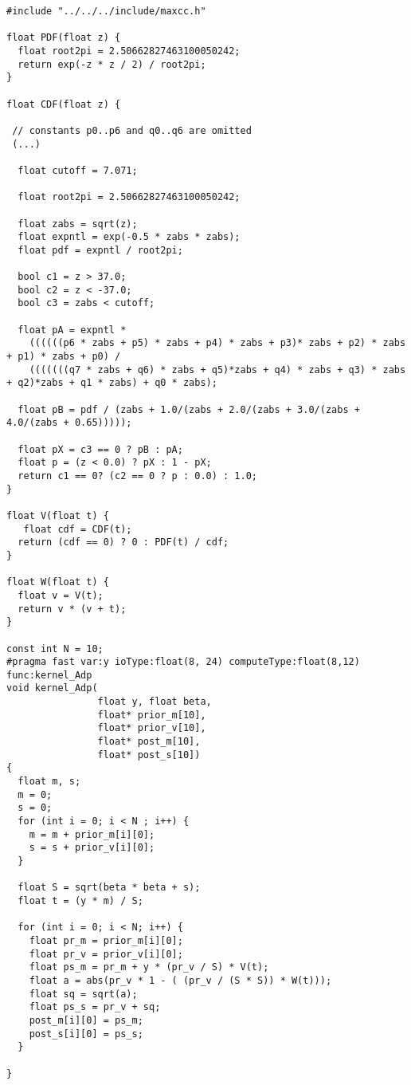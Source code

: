 \label{app:add-prediction}
\begin{lstlisting}
#include "../../../include/maxcc.h"

float PDF(float z) {
  float root2pi = 2.50662827463100050242;
  return exp(-z * z / 2) / root2pi;
}

float CDF(float z) {

 // constants p0..p6 and q0..q6 are omitted
 (...)

  float cutoff = 7.071;

  float root2pi = 2.50662827463100050242;

  float zabs = sqrt(z);
  float expntl = exp(-0.5 * zabs * zabs);
  float pdf = expntl / root2pi;

  bool c1 = z > 37.0;
  bool c2 = z < -37.0;
  bool c3 = zabs < cutoff;

  float pA = expntl *
    ((((((p6 * zabs + p5) * zabs + p4) * zabs + p3)* zabs + p2) * zabs + p1) * zabs + p0) /
    (((((((q7 * zabs + q6) * zabs + q5)*zabs + q4) * zabs + q3) * zabs + q2)*zabs + q1 * zabs) + q0 * zabs);

  float pB = pdf / (zabs + 1.0/(zabs + 2.0/(zabs + 3.0/(zabs + 4.0/(zabs + 0.65)))));

  float pX = c3 == 0 ? pB : pA;
  float p = (z < 0.0) ? pX : 1 - pX;
  return c1 == 0? (c2 == 0 ? p : 0.0) : 1.0;
}

float V(float t) {
   float cdf = CDF(t);
  return (cdf == 0) ? 0 : PDF(t) / cdf;
}

float W(float t) {
  float v = V(t);
  return v * (v + t);
}

const int N = 10;
#pragma fast var:y ioType:float(8, 24) computeType:float(8,12) func:kernel_Adp
void kernel_Adp(
                float y, float beta,
                float* prior_m[10],
                float* prior_v[10],
                float* post_m[10],
                float* post_s[10])
{
  float m, s;
  m = 0;
  s = 0;
  for (int i = 0; i < N ; i++) {
    m = m + prior_m[i][0];
    s = s + prior_v[i][0];
  }

  float S = sqrt(beta * beta + s);
  float t = (y * m) / S;

  for (int i = 0; i < N; i++) {
    float pr_m = prior_m[i][0];
    float pr_v = prior_v[i][0];
    float ps_m = pr_m + y * (pr_v / S) * V(t);
    float a = abs(pr_v * 1 - ( (pr_v / (S * S)) * W(t)));
    float sq = sqrt(a);
    float ps_s = pr_v + sq;
    post_m[i][0] = ps_m;
    post_s[i][0] = ps_s;
  }

}

\end{lstlisting}